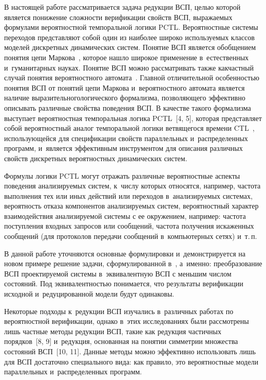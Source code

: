 \begin{multicols}{2}
В настоящей работе рассматривается задача редукции ВСП,
целью которой является понижение сложности
верификации свойств ВСП, выражаемых формулами вероятностной
темпоральной логики PCTL. Вероятностные системы переходов
представляют собой один из наиболее
широко используемых классов моделей дискретных динамических систем.
Понятие ВСП является обобщением понятия цепи Маркова~\cite{markov},
которое нашло широкое применение в~естественных  и~гуманитарных
науках. Понятие ВСП можно рассматривать также как\linebreak частный случай
понятия вероятностного автомата~\cite{buh}. Главной отличительной
особенностью понятия ВСП от понятий цепи Маркова и~вероятностного
автомата является наличие выразительного\linebreak логическо\-го формализма,
позволяющего эффективно описывать различные свойства поведения ВСП.
В качестве такого формализма выступает вероятностная темпоральная
логика PCTL~[4, 5], которая представляет собой вероятностный аналог
темпоральной логики ветвящегося времени CTL~\cite{peled},
использующейся для спецификации свойств параллельных и~распределенных программ,
и~является эффективным инструментом для
описания различных свойств дискретных вероятностных динамических
систем.

Формулы логики PCTL могут отражать различные вероятностные аспекты
поведения анализируемых систем, к~числу которых относятся, например,
частота выполнения тех или иных действий или переходов в~анализируемых системах,
вероятность отказа компонентов анализируемых
систем, вероятностный характер взаимодействия анализируемой системы
с ее окружением, например: час\-то\-та поступления входных запросов или
сообщений, частота получения искаженных сообщений (для протоколов
передачи сообщений в~компьютерных сетях) и~т.\,п.


В данной работе  уточняются основные формулировки  и~демонстрируется
на новом примере  решение задачи, сформулированной в~\cite{mf},
а~именно:  преобразование ВСП проектируемой системы в~эквивалентную
ВСП с меньшим числом со\-сто\-яний. Под эквивалентностью понимается, что
результаты верификации исходной и~редуцированной модели будут
одинаковы.

Некоторые подходы к~редукции ВСП изучались в~различных работах по
вероятностной верификации, однако в~этих исследованиях были
рас\-смот\-ре\-ны лишь частные методы редукции ВСП, такие как редукция
частичных порядков~[8, 9] и~редукция, основанная на понятии
симметрии множества состояний ВСП~[10, 11]. Данные методы можно
эффективно использовать лишь для ВСП достаточно специального вида:
как правило, это вероятностные модели параллельных и~распределенных
программ.



\end{multicols}
